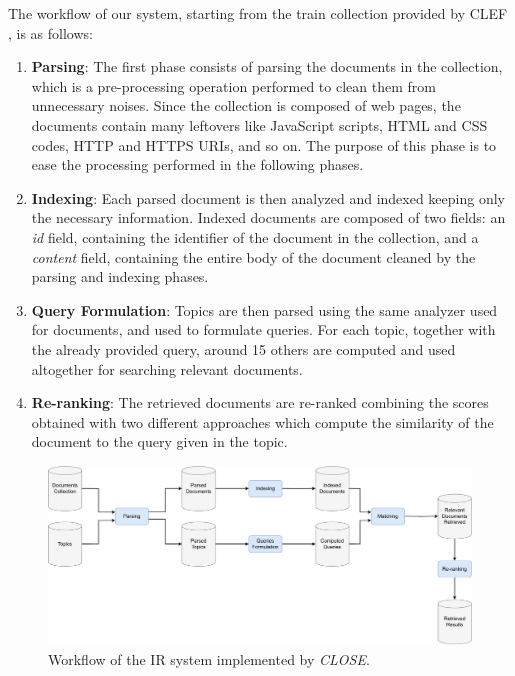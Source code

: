 The workflow of our system, starting from the train collection provided by \ac{CLEF} \cite{cleflongeval}, is as follows:
\begin{enumerate}
    \item \textbf{Parsing}: The first phase consists of parsing the documents in the collection, which is a pre-processing operation performed to clean them from unnecessary noises. Since the collection is composed of web pages, the documents contain many leftovers like JavaScript scripts, HTML and CSS codes, HTTP and HTTPS URIs, and so on. The purpose of this phase is to ease the processing performed in the following phases.

    \item \textbf{Indexing}: Each parsed document is then analyzed and indexed keeping only the necessary information. Indexed documents are composed of two fields: an \textit{id} field, containing the identifier of the document in the collection, and a \textit{content} field, containing the entire body of the document cleaned by the parsing and indexing phases.

    \item \textbf{Query Formulation}: Topics are then parsed using the same analyzer used for documents, and used to formulate queries. For each topic, together with the already provided query, around 15 others are computed and used altogether for searching relevant documents.

    \item \textbf{Re-ranking}: The retrieved documents are re-ranked combining the scores obtained with two different approaches which compute the similarity of the document to the query given in the topic.

\end{enumerate}

\begin{figure}[!h]
    \centering
    \includegraphics[width=\textwidth, height=\textheight, keepaspectratio]{figure/CLOSE_IR_Workflow (2).pdf}
    \caption{Workflow of the IR system implemented by \textit{CLOSE}.}
    \label{fig:CLOSE_IR_Workflow}
\end{figure}


